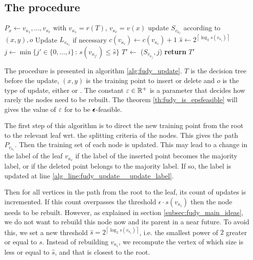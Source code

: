 \subsection{The \AlgoUpdate{} procedure}

\begin{algorithm}
\caption{\algo{}.\AlgoUpdate{}} \label{alg:fudy_update}
\begin{algorithmic}[1]
\State $P_{x} \gets v_{\kappa_1},\dots, v_{\kappa_\ell}$ with  $v_{\kappa_1}=r(T)$, $v_{\kappa_\ell}=v(x)$ \label{alg_line:fudy_update__get_path}
\State update $S_{v_{\kappa_\ell}}$ according to $(x,y),o$ \label{alg_line:fudy_update__update_dataset}
\State Update $L_{v_{\kappa_\ell}}$ if necessary \label{alg_line:fudy_update__update_label}
\State $c({v_{\kappa_i}}) \gets c(v_{\kappa_i})+1$
\label{alg_line:fudy_update__if_need_to_recompute}
\State $\hat{s} \gets 2^{\left\lceil \log_2 s ( v_{\kappa_i})  \right\rceil }$ \label{alg_line:fudy_update__recompute_thresh}
\State $j \gets \min \{ j' \in \{0,\ldots,i\} \,:\, s(v_{\kappa_{j'}}) \leq \hat{s} \}$ \label{alg_line:fudy_update__min_vert_recompute}
\State $T' \gets$ \AlgoBuild{}($S_{v_{\kappa_j}},j$)
\State \textbf{return} $T'$
\EndIf
\EndFor
\EndProcedure
\end{algorithmic}
\end{algorithm}

The \AlgoUpdate{} procedure is presented in algorithm \ref{alg:fudy_update}. $T$ is the decision tree before the update, $(x,y)$ is the training point to insert or delete and $o$ is the type of update, either \ins{} or \del{}. The constant $\varepsilon \in \mathbb{R}^+$ is a parameter that decides how rarely the nodes need to be rebuilt. The theorem \ref{th:fudy_is_epsfeasible} will gives the value of $\varepsilon$ for \algo{} to be $\pmb{\epsilon}$-feasible.

The first step of this algorithm is to direct the new training point from the root to the relevant leaf wrt. the splitting criteria of the nodes. This gives the path $P_{v_{\kappa_\ell}}$. Then the training set of each node is updated. This may lead to a change in the label of the leaf $v_{\kappa_\ell}$ if the label of the inserted point becomes the majority label, or if the deleted point belongs to the majority label. If so, the label is updated at line \ref{alg_line:fudy_update__update_label}.

Then for all vertices in the path from the root to the leaf, its count of updates is incremented. If this count overpasses the threshold $\epsilon \cdot s ( v_{\kappa_i})$ then the node needs to be rebuilt. However, as explained in section \ref{subsec:fudy_main_ideas}, we do not want to rebuild this node now and its parent in a near future. To avoid this, we set a new threshold $\hat{s} = 2^{\left\lceil \log_2 s ( v_{\kappa_i})  \right\rceil }$, i.e. the smallest power of $2$ greater or equal to $s$. Instead of rebuilding $v_{\kappa_i}$, we recompute the vertex of which size is less or equal to $\hat{s}$, and that is closest to the root.

